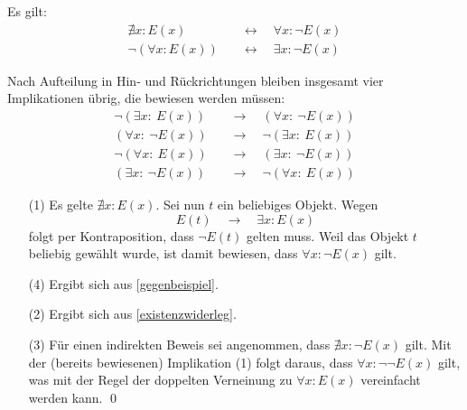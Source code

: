 \begin{satz} \label{quantorennegieren} 
    Es gilt:
    \begin{align*}
        \nexists x: E(x) \quad& \leftrightarrow\quad \forall x: \neg E(x) \\
        \neg (\forall x: E(x)) \quad& \leftrightarrow\quad \exists x: \neg E(x)
    \end{align*}
\end{satz}


\begin{bew}[(*)]
    Nach Aufteilung in Hin- und Rückrichtungen bleiben insgesamt vier Implikationen übrig, die bewiesen werden müssen:
    \begin{align}
        \neg (\exists x:\ E(x)) \quad& \to\quad (\forall x:\ \neg E(x)) \tag{1} \\
        (\forall x:\ \neg E(x)) \quad& \to\quad \neg (\exists x:\ E(x)) \tag{2} \\
        \neg (\forall x:\ E(x)) \quad& \to\quad (\exists x:\ \neg E(x)) \tag{3} \\
        (\exists x:\ \neg E(x)) \quad& \to\quad \neg (\forall x:\ E(x)) \tag{4}
    \end{align}
    \begin{enumerate}
        \item[(1)] Es gelte $\nexists x : E(x)$. Sei nun $t$ ein beliebiges Objekt. Wegen
            \[ E(t) \quad \to \quad \exists x: E(x) \]
        folgt per Kontraposition, dass $\neg E(t)$ gelten muss. Weil das Objekt $t$ beliebig gewählt wurde, ist damit bewiesen, dass $\forall x: \neg E(x)$ gilt.
        \item[(4)] Ergibt sich aus \cref{gegenbeispiel}.
        \item[(2)] Ergibt sich aus \cref{existenzwiderleg}.
        \item[(3)] Für einen indirekten Beweis sei angenommen, dass $\nexists x: \neg E(x)$ gilt. Mit der (bereits bewiesenen) Implikation (1) folgt daraus, dass $\forall x: \neg\neg E(x)$ gilt, was mit der Regel der doppelten Verneinung zu $\forall x: E(x)$ vereinfacht werden kann. \qed
    \end{enumerate}
\end{bew}



